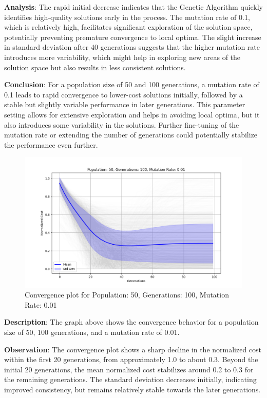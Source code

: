\documentclass{article}
\begin{document}
    \textbf{Analysis}: The rapid initial decrease indicates that the Genetic Algorithm quickly identifies high-quality solutions early in the process. The mutation rate of 0.1, which is relatively high, facilitates significant exploration of the solution space, potentially preventing premature convergence to local optima. The slight increase in standard deviation after 40 generations suggests that the higher mutation rate introduces more variability, which might help in exploring new areas of the solution space but also results in less consistent solutions.

    \textbf{Conclusion}: For a population size of 50 and 100 generations, a mutation rate of 0.1 leads to rapid convergence to lower-cost solutions initially, followed by a stable but slightly variable performance in later generations. This parameter setting allows for extensive exploration and helps in avoiding local optima, but it also introduces some variability in the solutions. Further fine-tuning of the mutation rate or extending the number of generations could potentially stabilize the performance even further.

    \begin{figure}[H]
        \centering
        \includegraphics[width=\textwidth]{genetic_algorithm/Population_50_Generations_100_MutationRate_0.01}
        \caption{Convergence plot for Population: 50, Generations: 100, Mutation Rate: 0.01}
        \label{fig:ga_50_100_01}
    \end{figure}

    \textbf{Description}: The graph above shows the convergence behavior for a population size of 50, 100 generations, and a mutation rate of 0.01.

    \textbf{Observation}: The convergence plot shows a sharp decline in the normalized cost within the first 20 generations, from approximately 1.0 to about 0.3. Beyond the initial 20 generations, the mean normalized cost stabilizes around 0.2 to 0.3 for the remaining generations. The standard deviation decreases initially, indicating improved consistency, but remains relatively stable towards the later generations.
\end{document}
